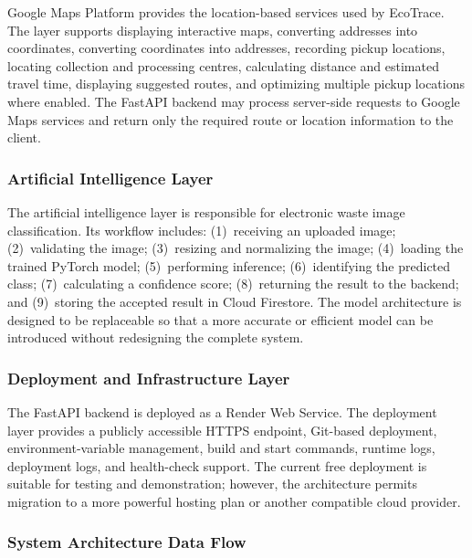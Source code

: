 Google Maps Platform provides the location-based services used by
EcoTrace. The layer supports displaying interactive maps, converting addresses
into coordinates, converting coordinates into addresses, recording pickup
locations, locating collection and processing centres, calculating distance and
estimated travel time, displaying suggested routes, and optimizing multiple
pickup locations where enabled. The FastAPI backend may process server-side
requests to Google Maps services and return only the required route or
location information to the client.

\subsubsection{Artificial Intelligence Layer}

The artificial intelligence layer is responsible for electronic waste image
classification. Its workflow includes: (1)~receiving an uploaded image;
(2)~validating the image; (3)~resizing and normalizing the image; (4)~loading
the trained PyTorch model; (5)~performing inference; (6)~identifying the
predicted class; (7)~calculating a confidence score; (8)~returning the result to
the backend; and (9)~storing the accepted result in Cloud Firestore. The model
architecture is designed to be replaceable so that a more accurate or efficient
model can be introduced without redesigning the complete system.

\subsubsection{Deployment and Infrastructure Layer}

The FastAPI backend is deployed as a Render Web Service. The deployment
layer provides a publicly accessible HTTPS endpoint, Git-based deployment,
environment-variable management, build and start commands, runtime logs,
deployment logs, and health-check support. The current free deployment is
suitable for testing and demonstration; however, the architecture permits
migration to a more powerful hosting plan or another compatible cloud
provider.

\subsubsection{System Architecture Data Flow}

